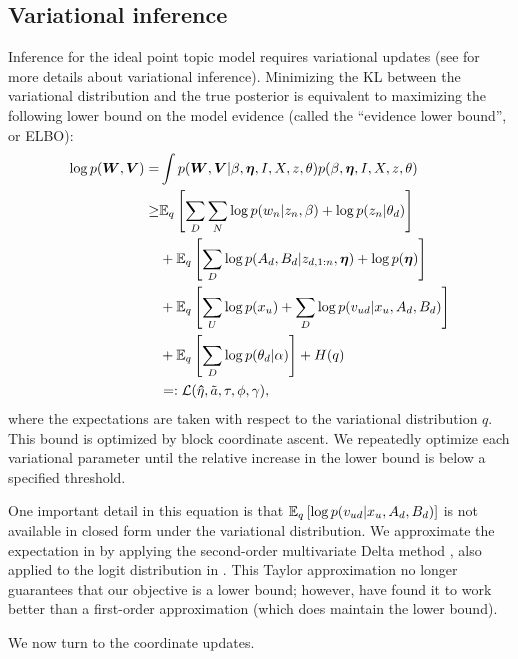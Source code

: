 \newcommand{\Ell}{\mathcal{L}}

\subsection*{Variational inference}

Inference for the ideal point topic model requires variational updates
(see \cite{jordan:1999} for more details about variational inference).
Minimizing the KL between the variational distribution and the true
posterior is equivalent to maximizing the following lower bound on the
model evidence (called the ``evidence lower bound'', or ELBO):
\begin{align}
\log p(\bm W, \bm V) = &
\int p(\bm W, \bm V | \beta, \bm \eta, I, X, z, \theta) p(\beta, \bm \eta, I, X, z, \theta) \nonumber \\
 \geq & \expectq{\sum_D \sum_N \log p(w_n | z_n, \beta)
   + \log p(z_n | \theta_d)} \nonumber \\
& + \expectq{ \sum_D \log p(A_d, B_d | z_{d, 1:n}, \bm \eta) + \log p(\bm \eta) }\nonumber \\
& + \expectq{ \sum_U \log p(x_u) + \sum_D \log p(v_{ud} | x_u, A_d, B_d) } \nonumber \\
& + \expectq{ \sum_D \log p(\theta_d | \alpha) } + H(q) \nonumber \\
& =: \Ell(\ev, {\tilde a}, \tau, \phi, \gamma),  \label{eq:elbo}
\end{align}
where the expectations are taken with respect to the variational
distribution $q$. This bound is optimized by block coordinate ascent.
We repeatedly optimize each variational parameter until the relative
increase in the lower bound is below a specified threshold.


One important detail in this equation is that $\mathbb{E}_q\left[\log p(v_{ud}
  | x_u, A_d, B_d)\right]$ is not available in closed form under the variational
distribution.  We approximate the expectation in  by
applying the second-order multivariate Delta method
\cite{bickel:2007}, also applied to the logit distribution in
\cite{chang:2009,braun:2007}.  This Taylor approximation no longer
guarantees that our objective is a lower bound; however,
\cite{braun:2007} have found it to work better than a first-order
approximation (which does maintain the lower bound).

We now turn to the coordinate updates.

